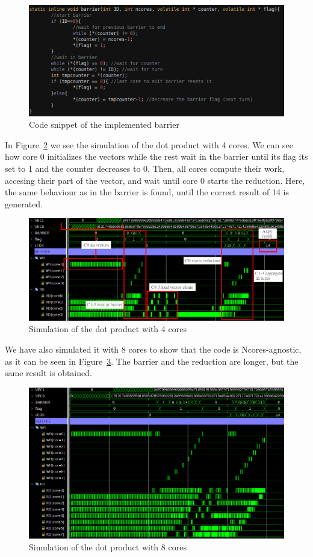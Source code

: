 \begin{figure}[h!]
    \centering
    \includegraphics[width=.9\textwidth]{images/barrier.png}
    \caption{Code snippet of the implemented barrier}
    \label{barrier}
\end{figure}

In Figure~\ref{4dot-sim} we see the simulation of the dot product with 4 cores.
We can see how core 0 initializes the vectors while the rest wait in the barrier until its flag its set to 1 and the counter decreases to 0.
Then, all cores compute their work, accesing their part of the vector, and wait until core 0 starts the reduction.
Here, the same behaviour as in the barrier is found, until the correct result of 14 is generated.

\begin{figure}[]
    \centering
    \includegraphics[width=1.0\textwidth]{images/axpy_sim4_crop_arrow.png}
    \caption{Simulation of the dot product with 4 cores}
    \label{4dot-sim}
\end{figure}

We have also simulated it with 8 cores to show that the code is Ncores-agnostic, as it can be seen in Figure~\ref{8dot-sim}.
The barrier and the reduction are longer, but the same result is obtained.

\begin{figure}[]
    \centering
    \includegraphics[width=1.0\textwidth]{images/axpy_sim8_crop.png}
    \caption{Simulation of the dot product with 8 cores}
    \label{8dot-sim}
\end{figure}










